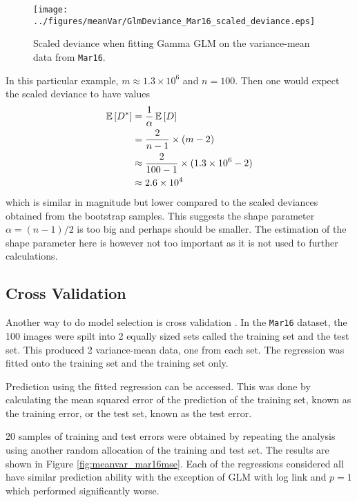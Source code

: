 \begin{figure}
    \centering
    \texttt{[image: ../figures/meanVar/GlmDeviance\_Mar16\_scaled\_deviance.eps]}
    \caption{Scaled deviance when fitting Gamma GLM on the variance-mean data from \texttt{Mar16}.}
    \label{fig:meanvar_deviance_mar16}
\end{figure}

In this particular example, $m\approx 1.3\times 10^6$ and $n=100$. Then one would expect the scaled deviance to have values
\begin{align*}
    \operatorname{\mathbb{E}}\left[D^*\right]&=\frac{1}{\alpha}\operatorname{\mathbb{E}}\left[D\right]
    \\
    &=\frac{2}{n-1}\times (m-2)
    \\
    &\approx \frac{2}{100-1}\times (1.3\times 10^6-2)
    \\
    &\approx 2.6 \times 10^4
\end{align*}
which is similar in magnitude but lower compared to the scaled deviances obtained from the bootstrap samples. This suggests the shape parameter $\alpha=(n-1)/2$ is too big and perhaps should be smaller. The estimation of the shape parameter here is however not too important as it is not used to further calculations.

\subsection{Cross Validation}

Another way to do model selection is cross validation \cite{friedman2001elements}. In the \texttt{Mar16} dataset, the 100 images were spilt into 2 equally sized sets called the training set and the test set. This produced 2 variance-mean data, one from each set. The regression was fitted onto the training set and the training set only.

Prediction using the fitted regression can be accessed. This was done by calculating the mean squared error of the prediction of the training set, known as the training error, or the test set, known as the test error.

20 samples of training and test errors were obtained by repeating the analysis using another random allocation of the training and test set. The results are shown in Figure \ref{fig:meanvar_mar16mse}. Each of the regressions considered all have similar prediction ability with the exception of GLM with log link and $p=1$ which performed significantly worse.

